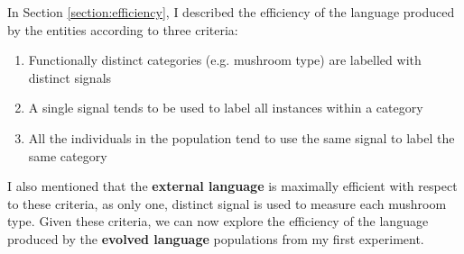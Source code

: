 \documentclass[12pt,a4paper,twoside,openright]{report}
\begin{document}
In Section \ref{section:efficiency}, I described the efficiency of the language produced by the entities according to three criteria:

\begin{enumerate}
	\item Functionally distinct categories (e.g. mushroom type) are labelled with distinct signals
	\item A single signal tends to be used to label all instances within a category
	\item All the individuals in the population tend to use the same signal to label the same category
\end{enumerate}

I also mentioned that the {\bf external language} is maximally efficient with respect to these criteria, as only one, distinct signal is used to measure each mushroom type. Given these criteria, we can now explore the efficiency of the language produced by the {\bf evolved language} populations from my first experiment. 
\end{document}
